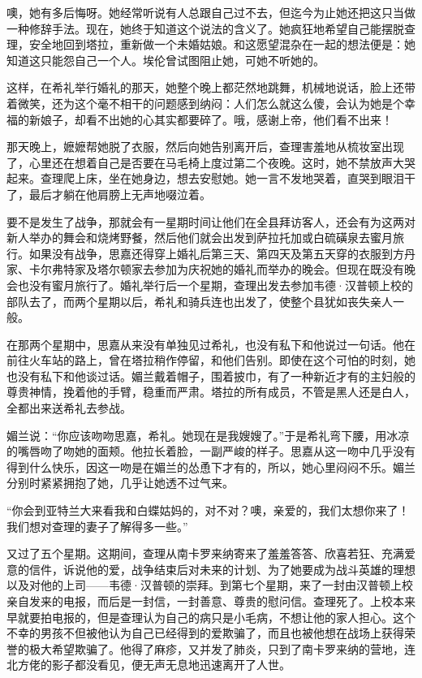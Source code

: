 \par 噢，她有多后悔呀。她经常听说有人总跟自己过不去，但迄今为止她还把这只当做一种修辞手法。现在，她终于知道这个说法的含义了。她疯狂地希望自己能摆脱查理，安全地回到塔拉，重新做一个未婚姑娘。和这愿望混杂在一起的想法便是：她知道这只能怨自己一个人。埃伦曾试图阻止她，可她不听她的。
\par 这样，在希礼举行婚礼的那天，她整个晚上都茫然地跳舞，机械地说话，脸上还带着微笑，还为这个毫不相干的问题感到纳闷：人们怎么就这么傻，会认为她是个幸福的新娘子，却看不出她的心其实都要碎了。哦，感谢上帝，他们看不出来！
\par 那天晚上，嬷嬷帮她脱了衣服，然后向她告别离开后，查理害羞地从梳妆室出现了，心里还在想着自己是否要在马毛椅上度过第二个夜晚。这时，她不禁放声大哭起来。查理爬上床，坐在她身边，想去安慰她。她一言不发地哭着，直哭到眼泪干了，最后才躺在他肩膀上无声地啜泣着。
\par 要不是发生了战争，那就会有一星期时间让他们在全县拜访客人，还会有为这两对新人举办的舞会和烧烤野餐，然后他们就会出发到萨拉托加或白硫磺泉去蜜月旅行。如果没有战争，思嘉还得穿上婚礼后第三天、第四天及第五天穿的衣服到方丹家、卡尔弗特家及塔尔顿家去参加为庆祝她的婚礼而举办的晚会。但现在既没有晚会也没有蜜月旅行了。婚礼举行后一个星期，查理出发去参加韦德·汉普顿上校的部队去了，而两个星期以后，希礼和骑兵连也出发了，使整个县犹如丧失亲人一般。
\par 在那两个星期中，思嘉从来没有单独见过希礼，也没有私下和他说过一句话。他在前往火车站的路上，曾在塔拉稍作停留，和他们告别。即使在这个可怕的时刻，她也没有私下和他谈过话。媚兰戴着帽子，围着披巾，有了一种新近才有的主妇般的尊贵神情，挽着他的手臂，稳重而严肃。塔拉的所有成员，不管是黑人还是白人，全都出来送希礼去参战。
\par 媚兰说：“你应该吻吻思嘉，希礼。她现在是我嫂嫂了。”于是希礼弯下腰，用冰凉的嘴唇吻了吻她的面颊。他拉长着脸，一副严峻的样子。思嘉从这一吻中几乎没有得到什么快乐，因这一吻是在媚兰的怂恿下才有的，所以，她心里闷闷不乐。媚兰分别时紧紧拥抱了她，几乎让她透不过气来。
\par “你会到亚特兰大来看我和白蝶姑妈的，对不对？噢，亲爱的，我们太想你来了！我们想对查理的妻子了解得多一些。”
\par 又过了五个星期。这期间，查理从南卡罗来纳寄来了羞羞答答、欣喜若狂、充满爱意的信件，诉说他的爱，战争结束后对未来的计划、为了她要成为战斗英雄的理想以及对他的上司——韦德·汉普顿的崇拜。到第七个星期，来了一封由汉普顿上校亲自发来的电报，而后是一封信，一封善意、尊贵的慰问信。查理死了。上校本来早就要拍电报的，但是查理认为自己的病只是小毛病，不想让他的家人担心。这个不幸的男孩不但被他认为自己已经得到的爱欺骗了，而且也被他想在战场上获得荣誉的极大希望欺骗了。他得了麻疹，又并发了肺炎，只到了南卡罗来纳的营地，连北方佬的影子都没看见，便无声无息地迅速离开了人世。
